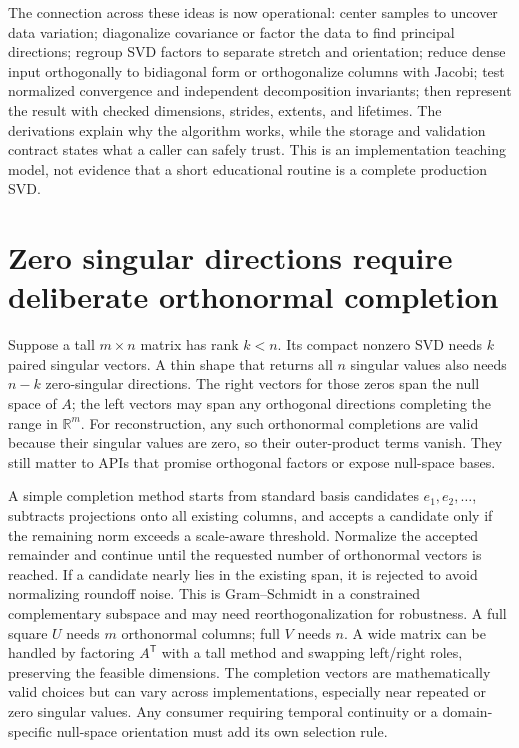 The connection across these ideas is now operational: center samples to uncover data variation; diagonalize covariance or factor the data to find principal directions; regroup SVD factors to separate stretch and orientation; reduce dense input orthogonally to bidiagonal form or orthogonalize columns with Jacobi; test normalized convergence and independent decomposition invariants; then represent the result with checked dimensions, strides, extents, and lifetimes. The derivations explain why the algorithm works, while the storage and validation contract states what a caller can safely trust. This is an implementation teaching model, not evidence that a short educational routine is a complete production SVD.

\section{Zero singular directions require deliberate orthonormal completion}\label{02-foundations-ii-ch038-zero-singular-directions-require-deliberate-orthonormal-completion}

Suppose a tall \(m\times n\) matrix has rank \(k<n\). Its compact nonzero SVD needs \(k\) paired singular vectors. A thin shape that returns all \(n\) singular values also needs \(n-k\) zero-singular directions. The right vectors for those zeros span the null space of \(A\); the left vectors may span any orthogonal directions completing the range in \(\mathbb R^m\). For reconstruction, any such orthonormal completions are valid because their singular values are zero, so their outer-product terms vanish. They still matter to APIs that promise orthogonal factors or expose null-space bases.

A simple completion method starts from standard basis candidates \(e_1,e_2,\ldots\), subtracts projections onto all existing columns, and accepts a candidate only if the remaining norm exceeds a scale-aware threshold. Normalize the accepted remainder and continue until the requested number of orthonormal vectors is reached. If a candidate nearly lies in the existing span, it is rejected to avoid normalizing roundoff noise. This is Gram--Schmidt in a constrained complementary subspace and may need reorthogonalization for robustness. A full square \(U\) needs \(m\) orthonormal columns; full \(V\) needs \(n\). A wide matrix can be handled by factoring \(A^\mathsf T\) with a tall method and swapping left/right roles, preserving the feasible dimensions. The completion vectors are mathematically valid choices but can vary across implementations, especially near repeated or zero singular values. Any consumer requiring temporal continuity or a domain-specific null-space orientation must add its own selection rule.

